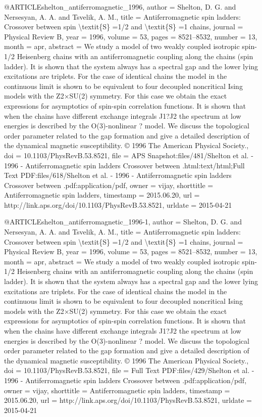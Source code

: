 @ARTICLE{shelton_antiferromagnetic_1996,
  author = {Shelton, D. G. and Nersesyan, A. A. and Tsvelik, A. M.},
  title = {Antiferromagnetic spin ladders: {Crossover} between spin {\textbackslash}textit\{{S}\}
	=1/2 and {\textbackslash}textit\{{S}\} =1 chains},
  journal = {Physical Review B},
  year = {1996},
  volume = {53},
  pages = {8521--8532},
  number = {13},
  month = apr,
  abstract = {We study a model of two weakly coupled isotropic spin-1/2 Heisenberg
	chains with an antiferromagnetic coupling along the chains (spin
	ladder). It is shown that the system always has a spectral gap and
	the lower lying excitations are triplets. For the case of identical
	chains the model in the continuous limit is shown to be equivalent
	to four decoupled noncritical Ising models with the Z2×SU(2) symmetry.
	For this case we obtain the exact expressions for asymptotics of
	spin-spin correlation functions. It is shown that when the chains
	have different exchange integrals J1?J2 the spectrum at low energies
	is described by the O(3)-nonlinear ? model. We discuss the topological
	order parameter related to the gap formation and give a detailed
	description of the dynamical magnetic susceptibility. © 1996 The
	American Physical Society.},
  doi = {10.1103/PhysRevB.53.8521},
  file = {APS Snapshot:files/481/Shelton et al. - 1996 - Antiferromagnetic spin ladders Crossover between .html:text/html;Full Text PDF:files/618/Shelton et al. - 1996 - Antiferromagnetic spin ladders Crossover between .pdf:application/pdf},
  owner = {vijay},
  shorttitle = {Antiferromagnetic spin ladders},
  timestamp = {2015.06.20},
  url = {http://link.aps.org/doi/10.1103/PhysRevB.53.8521},
  urldate = {2015-04-21}
}

@ARTICLE{shelton_antiferromagnetic_1996-1,
  author = {Shelton, D. G. and Nersesyan, A. A. and Tsvelik, A. M.},
  title = {Antiferromagnetic spin ladders: {Crossover} between spin {\textbackslash}textit\{{S}\}
	=1/2 and {\textbackslash}textit\{{S}\} =1 chains},
  journal = {Physical Review B},
  year = {1996},
  volume = {53},
  pages = {8521--8532},
  number = {13},
  month = apr,
  abstract = {We study a model of two weakly coupled isotropic spin-1/2 Heisenberg
	chains with an antiferromagnetic coupling along the chains (spin
	ladder). It is shown that the system always has a spectral gap and
	the lower lying excitations are triplets. For the case of identical
	chains the model in the continuous limit is shown to be equivalent
	to four decoupled noncritical Ising models with the Z2×SU(2) symmetry.
	For this case we obtain the exact expressions for asymptotics of
	spin-spin correlation functions. It is shown that when the chains
	have different exchange integrals J1?J2 the spectrum at low energies
	is described by the O(3)-nonlinear ? model. We discuss the topological
	order parameter related to the gap formation and give a detailed
	description of the dynamical magnetic susceptibility. © 1996 The
	American Physical Society.},
  doi = {10.1103/PhysRevB.53.8521},
  file = {Full Text PDF:files/429/Shelton et al. - 1996 - Antiferromagnetic spin ladders Crossover between .pdf:application/pdf},
  owner = {vijay},
  shorttitle = {Antiferromagnetic spin ladders},
  timestamp = {2015.06.20},
  url = {http://link.aps.org/doi/10.1103/PhysRevB.53.8521},
  urldate = {2015-04-21}
}


